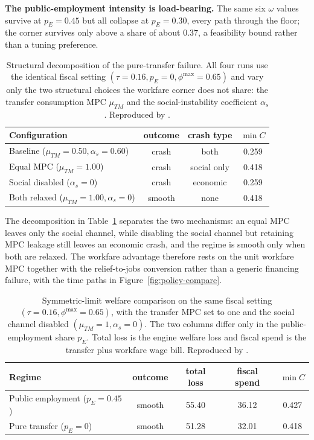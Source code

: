 \documentclass[review,12pt]{elsarticle}
\theoremstyle{plain}
\theoremstyle{definition}
\theoremstyle{remark}
\begin{document}
\smallskip\noindent\textbf{The public-employment intensity is load-bearing.} The same six $\omega$ values survive at $p_E=0.45$ but all collapse at $p_E=0.30$, every path through the floor; the corner survives only above a share of about $0.37$, a feasibility bound rather than a tuning preference.

\begin{table}[htbp]
\centering\small
\caption{Structural decomposition of the pure-transfer failure. All four runs use the identical fiscal setting $(\tau=0.16,p_E=0,\phi^{\max}=0.65)$ and vary only the two structural choices the workfare corner does not share: the transfer consumption MPC $\mu_{TM}$ and the social-instability coefficient $\alpha_s$. Reproduced by \protect{}.}\label{tab:transfer-structure}
\begin{tabular}{@{}lccc@{}}
\toprule
Configuration & outcome & crash type & $\min C$ \\
\midrule
Baseline ($\mu_{TM}=0.50,\alpha_s=0.60$) & crash & both & 0.259 \\
Equal MPC ($\mu_{TM}=1.00$) & crash & social only & 0.418 \\
Social disabled ($\alpha_s=0$) & crash & economic & 0.259 \\
Both relaxed ($\mu_{TM}=1.00,\alpha_s=0$) & smooth & none & 0.418 \\
\bottomrule
\end{tabular}
\end{table}

\noindent The decomposition in Table~\ref{tab:transfer-structure} separates the two mechanisms: an equal MPC leaves only the social channel, while disabling the social channel but retaining MPC leakage still leaves an economic crash, and the regime is smooth only when both are relaxed. The workfare advantage therefore rests on the unit workfare MPC together with the relief-to-jobs conversion rather than a generic financing failure, with the time paths in Figure~\ref{fig:policy-compare}.

\begin{table}[htbp]
\centering\small
\caption{Symmetric-limit welfare comparison on the same fiscal setting $(\tau=0.16,\phi^{\max}=0.65)$, with the transfer MPC set to one and the social channel disabled $(\mu_{TM}=1,\alpha_s=0)$. The two columns differ only in the public-employment share $p_E$. Total loss is the engine welfare loss and fiscal spend is the transfer plus workfare wage bill. Reproduced by \protect{}.}\label{tab:symmetric-welfare}
\begin{tabular}{@{}lcccc@{}}
\toprule
Regime & outcome & total loss & fiscal spend & $\min C$ \\
\midrule
Public employment ($p_E=0.45$) & smooth & 55.40 & 36.12 & 0.427 \\
Pure transfer ($p_E=0$) & smooth & 51.28 & 32.01 & 0.418 \\
\bottomrule
\end{tabular}
\end{table}
\end{document}
